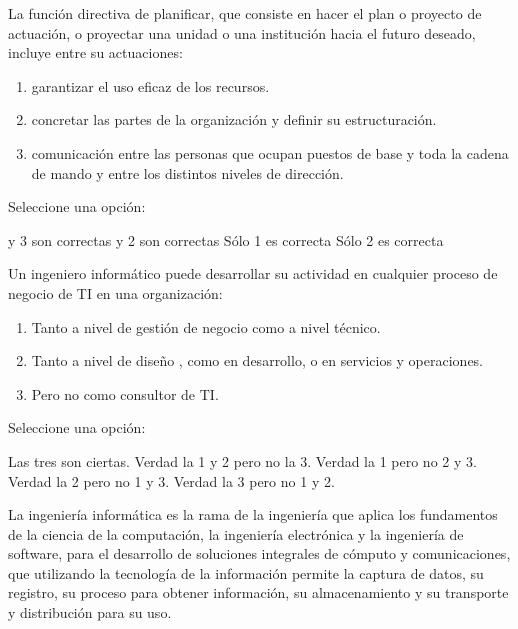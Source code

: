 \documentclass[a4paper]{exam}
\begin{document}
\begin{questions}
  
\question La función directiva de planificar, que consiste en hacer
  el plan o proyecto de actuación, o proyectar una unidad o una
  institución hacia el futuro deseado, incluye entre su actuaciones:

  \begin{enumerate}
  \item garantizar el uso eficaz de los recursos.
  \item concretar las partes de la organización y definir su
    estructuración.
  \item comunicación entre las personas que ocupan puestos de base y
    toda la cadena de mando y entre los distintos niveles de
    dirección.
  \end{enumerate}

  
  Seleccione una opción:
  
  \begin{choices}
     y 3 son correctas
     y 2 son correctas
    \CorrectChoice Sólo 1 es correcta
    \choice Sólo 2 es correcta
  \end{choices}

  
\question Un ingeniero informático puede desarrollar su actividad en
  cualquier proceso de negocio de TI en una organización:

  \begin{enumerate}
  \item Tanto a nivel de gestión de negocio  como a nivel técnico.
  \item Tanto a nivel de diseño , como en desarrollo, o en servicios y operaciones.
  \item Pero no como consultor de TI.
  \end{enumerate}

  
  Seleccione una opción:
  
  \begin{choices}
    \choice Las tres son ciertas.
    \CorrectChoice Verdad la 1 y 2 pero no la 3.
    \choice Verdad  la 1 pero no  2 y 3.
    \choice Verdad  la  2 pero no 1 y 3.
    \choice Verdad la  3 pero no  1 y 2.
  \end{choices}

\question La ingeniería informática es la rama de la ingeniería que
  aplica los fundamentos de la ciencia de la computación, la
  ingeniería electrónica y la ingeniería de software, para el
  desarrollo de soluciones integrales de cómputo y comunicaciones, que
  utilizando la tecnología de la información permite la captura de
  datos, su registro, su proceso para obtener información, su
  almacenamiento y su transporte y distribución para su uso.


\end{questions}
\end{document}
